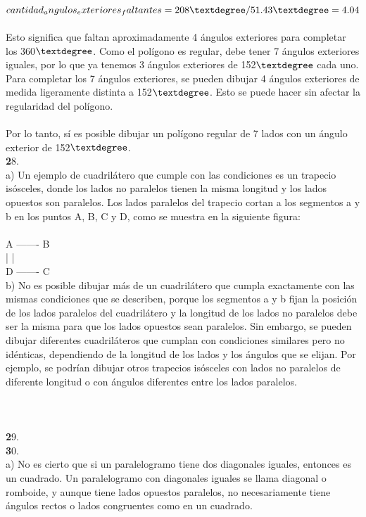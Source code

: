 \documentclass{article}
\begin{document}
\\
$cantidad_angulos_exteriores_faltantes = 208\textdegree / 51.43\textdegree = 4.04$\\
\\
Esto significa que faltan aproximadamente 4 ángulos exteriores para completar los 360$\textdegree$. Como el polígono es regular, debe tener 7 ángulos exteriores iguales, por lo que ya tenemos 3 ángulos exteriores de 152$\textdegree$ cada uno. Para completar los 7 ángulos exteriores, se pueden dibujar 4 ángulos exteriores de medida ligeramente distinta a 152$\textdegree$. Esto se puede hacer sin afectar la regularidad del polígono.\\
\\
Por lo tanto, sí es posible dibujar un polígono regular de 7 lados con un ángulo exterior de 152$\textdegree$.\\
{\textbf 28. }\\
a) Un ejemplo de cuadrilátero que cumple con las condiciones es un trapecio isósceles, donde los lados no paralelos tienen la misma longitud y los lados opuestos son paralelos. Los lados paralelos del trapecio cortan a los segmentos a y b en los puntos A, B, C y D, como se muestra en la siguiente figura:\\
\\
A ------- B\\
|         |\\
D ------- C\\
b) No es posible dibujar más de un cuadrilátero que cumpla exactamente con las mismas condiciones que se describen, porque los segmentos a y b fijan la posición de los lados paralelos del cuadrilátero y la longitud de los lados no paralelos debe ser la misma para que los lados opuestos sean paralelos. Sin embargo, se pueden dibujar diferentes cuadriláteros que cumplan con condiciones similares pero no idénticas, dependiendo de la longitud de los lados y los ángulos que se elijan. Por ejemplo, se podrían dibujar otros trapecios isósceles con lados no paralelos de diferente longitud o con ángulos diferentes entre los lados paralelos.\\
\\
\\
\\
{\textbf 29. }\\
{\textbf 30. }\\
a) No es cierto que si un paralelogramo tiene dos diagonales iguales, entonces es un cuadrado. Un paralelogramo con diagonales iguales se llama diagonal o romboide, y aunque tiene lados opuestos paralelos, no necesariamente tiene ángulos rectos o lados congruentes como en un cuadrado.\\
\end{document}
